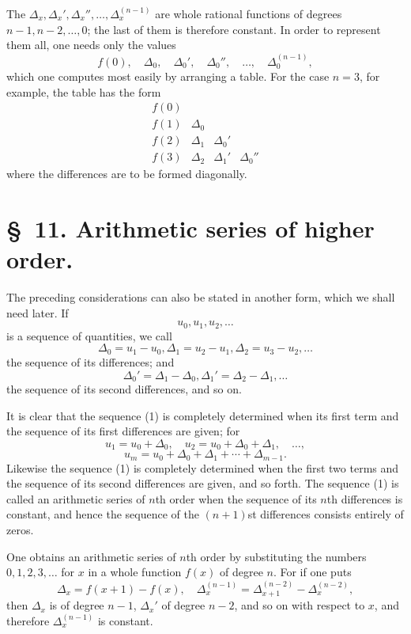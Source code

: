\documentclass[11pt]{article}
\begin{document}
The $\Delta_x,\Delta_x',\Delta_x'',\ldots,\Delta_x^{(n-1)}$ are whole rational functions of degrees $n-1,n-2,\ldots,0$; the last of them is therefore constant. In order to represent them all, one needs only the values
\[
 f(0),\quad \Delta_0,\quad \Delta_0',\quad \Delta_0'',\quad\ldots,\quad \Delta_0^{(n-1)},
\]
which one computes most easily by arranging a table. For the case $n=3$, for example, the table has the form
\[
\begin{array}{cccc}
f(0) &&&\\
f(1)&\Delta_0&&\\
f(2)&\Delta_1&\Delta_0'&\\
f(3)&\Delta_2&\Delta_1'&\Delta_0''
\end{array}
\]
where the differences are to be formed diagonally.

\section*{\S~11. Arithmetic series of higher order.}

The preceding considerations can also be stated in another form, which we shall need later. If
\begin{equation}
 u_0,u_1,u_2,\ldots
\tag{1}
\end{equation}
is a sequence of quantities, we call
\begin{equation}
 \Delta_0=u_1-u_0,
 \Delta_1=u_2-u_1,
 \Delta_2=u_3-u_2,\ldots
\tag{2}
\end{equation}
the sequence of its differences; and
\begin{equation}
 \Delta_0'=\Delta_1-\Delta_0,
 \Delta_1'=\Delta_2-\Delta_1,\ldots
\tag{3}
\end{equation}
the sequence of its second differences, and so on.

It is clear that the sequence (1) is completely determined when its first term and the sequence of its first differences are given; for
\[
 u_1=u_0+\Delta_0,
 \quad u_2=u_0+\Delta_0+\Delta_1,
 \quad\ldots,
\]
\[
 u_m=u_0+\Delta_0+\Delta_1+\cdots+\Delta_{m-1}.
\]
Likewise the sequence (1) is completely determined when the first two terms and the sequence of its second differences are given, and so forth. The sequence (1) is called an arithmetic series of $n$th order when the sequence of its $n$th differences is constant, and hence the sequence of the $(n+1)$st differences consists entirely of zeros.

One obtains an arithmetic series of $n$th order by substituting the numbers $0,1,2,3,\ldots$ for $x$ in a whole function $f(x)$ of degree $n$. For if one puts
\[
 \Delta_x=f(x+1)-f(x),\quad
 \Delta_x^{(n-1)}=\Delta_{x+1}^{(n-2)}-\Delta_x^{(n-2)},
\]
then $\Delta_x$ is of degree $n-1$, $\Delta_x'$ of degree $n-2$, and so on with respect to $x$, and therefore $\Delta_x^{(n-1)}$ is constant.
\end{document}
